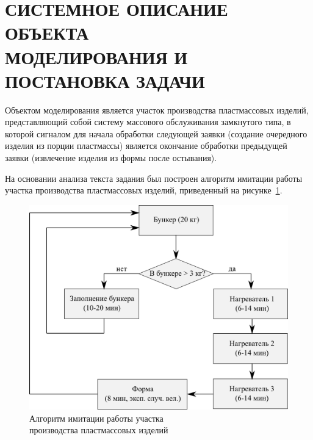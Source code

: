 \section[Системное описание объекта моделирования и постановка задачи]{
  СИСТЕМНОЕ ОПИСАНИЕ ОБЪЕКТА  \\ 
  МОДЕЛИРОВАНИЯ И ПОСТАНОВКА ЗАДАЧИ}
\label{sec:task_analisys}

Объектом моделирования является участок производства пластмассовых
изделий, представляющий собой систему массового обслуживания 
замкнутого типа, в которой сигналом для начала обработки следующей заявки
(создание очередного изделия из порции пластмассы)
является окончание обработки предыдущей заявки
(извлечение изделия из формы после остывания).

На основании анализа текста задания был построен алгоритм
имитации работы участка производства пластмассовых изделий,
приведенный на рисунке~\ref{pic:scheme}.

\begin{figure}[h!]
  \centering
  \includegraphics[width=150mm]{pic/scheme}
  \caption{Алгоритм имитации работы участка \\ 
    производства пластмассовых изделий}
  \label{pic:scheme}
\end{figure}
